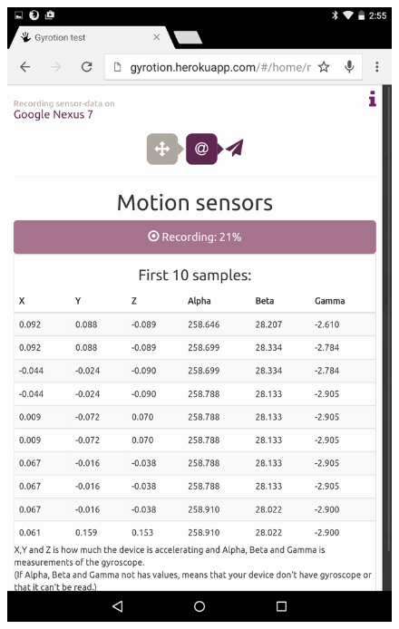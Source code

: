 \begin{figure}[H]
  \hspace{-2cm}
  \centering
  \begin{minipage}[c]{.23\textwidth}
    \centering
    \includegraphics[scale=0.1]{img/Nexus-rec}
  \end{minipage}
  \hspace{2cm}
  \begin{minipage}[c]{.23\textwidth}
    \centering

\end{minipage}
\end{figure}
